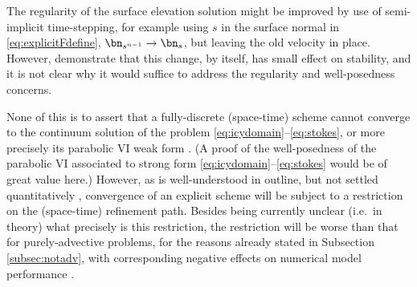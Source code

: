 The regularity of the surface elevation solution might be improved by use of semi-implicit time-stepping, for example using $s$ in the surface normal in \eqref{eq:explicitFdefine}, $\bn_{s^{n-1}} \to \bn_s$, but leaving the old velocity in place.  However, \cite{LofgrenAhlkronaHelanow2022} demonstrate that this change, by itself, has small effect on stability, and it is not clear why it would suffice to address the regularity and well-posedness concerns.

None of this is to assert that a fully-discrete (space-time) scheme cannot converge to the continuum solution of the problem \eqref{eq:icydomain}--\eqref{eq:stokes}, or more precisely its
parabolic VI weak form \cite{Glowinski1984}.  (A proof of the well-posedness of the parabolic VI associated to strong form \eqref{eq:icydomain}--\eqref{eq:stokes} would be of great value here.)  However, as is well-understood in outline, but not settled quantitatively \cite{Chengetal2017}, convergence of an explicit scheme will be subject to a restriction on the (space-time) refinement path.  Besides being currently unclear (i.e.~in theory) what precisely is this restriction, the restriction will be worse than that for purely-advective problems, for the reasons already stated in Subsection \ref{subsec:notadv}, with corresponding negative effects on numerical model performance \cite{Bueler2023}.
